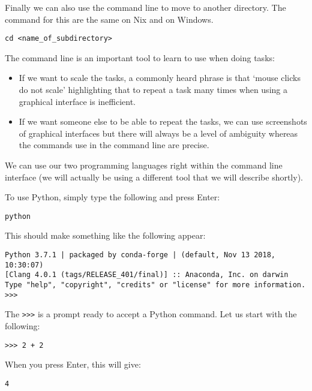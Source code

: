 Finally we can also use the command line to move to another directory. The
command for this are the same on Nix and on Windows.

\begin{verbatim}
cd <name_of_subdirectory>
\end{verbatim}


The command line is an important tool to learn to use when doing tasks:

\begin{itemize}
    \item If we want to scale the tasks, a commonly heard phrase is that `mouse
        clicks do not scale' highlighting that to repeat a task many times when
        using a graphical interface is inefficient.
    \item If we want someone else to be able to repeat the tasks, we can use
        screenshots of graphical interfaces but there will always be a level of
        ambiguity whereas the commands use in the command line are precise.
\end{itemize}

We can use our two programming languages right within the command line interface
(we will actually be using a different tool that we will describe shortly).

To use Python, simply type the following and press Enter:

\begin{verbatim}
python
\end{verbatim}

This should make something like the following appear:

\begin{verbatim}
Python 3.7.1 | packaged by conda-forge | (default, Nov 13 2018, 10:30:07)
[Clang 4.0.1 (tags/RELEASE_401/final)] :: Anaconda, Inc. on darwin
Type "help", "copyright", "credits" or "license" for more information.
>>>
\end{verbatim}

The \texttt{>>>} is a prompt ready to accept a Python command. Let
us start with the following:

\begin{verbatim}
>>> 2 + 2
\end{verbatim}

When you press Enter, this will give:

\begin{verbatim}
4
\end{verbatim}

